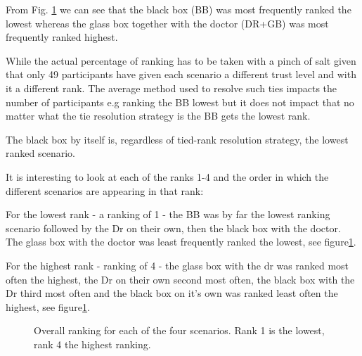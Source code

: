 \documentclass[manuscript,screen,review]{acmart}
\begin{document}


From Fig. \ref{fig:overall-ranking} we can see that the black box (BB) was most frequently ranked the lowest whereas the glass box together with the doctor (DR+GB) was most frequently ranked highest.

While the actual percentage of ranking has to be taken with a pinch of salt given that only 49 participants have given each scenario a different trust level and with it a different rank. The average method used to resolve such ties impacts the number of participants e.g ranking the BB lowest but it does not impact that no matter what the tie resolution strategy is the BB gets the lowest rank.

The black box by itself is, regardless of tied-rank resolution strategy, the lowest ranked scenario.

It is interesting to look at each of the ranks 1-4 and the order in which the different scenarios are appearing in that rank:

For the lowest rank - a ranking of 1 - the BB was by far the lowest ranking scenario followed by the Dr on their own, then the black box with the doctor. The glass box with the doctor was  least frequently ranked the lowest, see figure\ref{fig:overall-ranking}.

For the highest rank - ranking of 4 - the glass box with the dr was ranked most often the highest, the Dr on their own second most often, the black box with the Dr third most often and the black box on it's own was ranked least often the highest, see figure\ref{fig:overall-ranking}.

\begin{figure}[H]
    \caption{Overall ranking for each of the four scenarios. Rank 1 is the lowest, rank 4 the highest ranking.}
    \label{fig:overall-ranking}
\end{figure}
\end{document}
